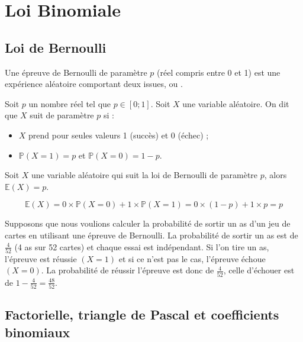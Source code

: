 \documentclass[french]{book}
\begin{document}
\setcounter{chapter}{7}
\chapter{Loi Binomiale}
\section{Loi de Bernoulli}

\begin{defn}
Une épreuve de Bernoulli de paramètre $p$ (réel compris entre 0 et 1) est une expérience aléatoire comportant deux issues,  ou .
\end{defn}

\begin{defn}
Soit $p$ un nombre réel tel que $p\in[0;1]$. Soit $X$ une variable aléatoire. On dit que $X$ suit  de paramètre $p$ si :
\begin{itemize}
 \item[$\bullet$] $X$ prend pour seules valeurs 1 (\og{}succès\fg{}) et 0 (\og{}échec\fg{}) ;
\item[$\bullet$] $\mathbb{P}(X=1)=p$ et $\mathbb{P}(X=0)=1-p$.
\end{itemize}
\end{defn}

\begin{prop}
 Soit $X$ une variable aléatoire qui suit la loi de Bernoulli de paramètre $p$, alors $\mathbb{E}(X)=p$.
\end{prop}

\begin{demo}
 $$\mathbb{E}(X)=0\times \mathbb{P}(X=0)+1\times \mathbb{P}(X=1)=0\times (1-p)+1\times p = p$$
\end{demo}

\begin{exemple}
Supposons que nous voulions calculer la probabilité de sortir un as d'un jeu de cartes en utilisant une épreuve de Bernoulli. 
La probabilité de sortir un as est de $\frac{4}{52}$ (4 as sur 52 cartes) et chaque essai est indépendant. 
Si l'on tire un as, l'épreuve est réussie $(X = 1)$ et si ce n'est pas le cas, l'épreuve échoue $(X = 0)$. 
La probabilité de réussir l'épreuve est donc de  $\frac{4}{52}$, celle d'échouer est de $1-\frac{4}{52}=\frac{48}{52}$.

\end{exemple}

\section{Factorielle, triangle de Pascal et coefficients binomiaux}
\end{document}
